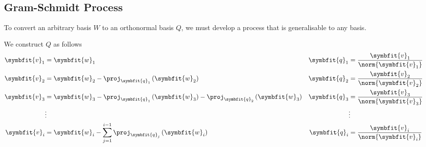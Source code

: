 \documentclass{article}
\begin{document}
\subsection{Gram-Schmidt Process}
To convert an arbitrary basis \(W\) to an orthonormal basis \(Q\), we
must develop a process that is generalisable to any basis.

We construct \(Q\) as follows
\begin{align*}
    \symbfit{v}_1 & = \symbfit{w}_1                                                                                                           & \symbfit{q}_1 & = \frac{\symbfit{v}_1}{\norm{\symbfit{v}_1}} \\
    \symbfit{v}_2 & = \symbfit{w}_2 - \proj_{\symbfit{q}_1} \left( \symbfit{w}_2 \right)                                                      & \symbfit{q}_2 & = \frac{\symbfit{v}_2}{\norm{\symbfit{v}_2}} \\
    \symbfit{v}_3 & = \symbfit{w}_3 - \proj_{\symbfit{q}_1} \left( \symbfit{w}_3 \right) - \proj_{\symbfit{q}_2} \left( \symbfit{w}_3 \right) & \symbfit{q}_3 & = \frac{\symbfit{v}_3}{\norm{\symbfit{v}_3}} \\
                  & \vdots                                                                                                                    &               & \vdots                                       \\
    \symbfit{v}_i & = \symbfit{w}_i - \sum_{j = 1}^{i - 1} \proj_{\symbfit{q}_j} \left( \symbfit{w}_i \right)                                 & \symbfit{q}_i & = \frac{\symbfit{v}_i}{\norm{\symbfit{v}_i}} 
\end{align*}
\end{document}
